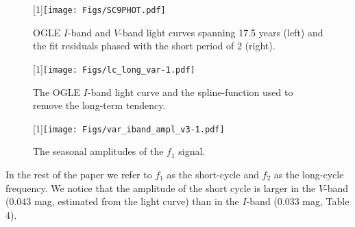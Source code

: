 \documentclass[useAMS,usenatbib]{mn2e}
\begin{document}



\begin{figure}
\scalebox{1}[1]{\texttt{[image: Figs/SC9PHOT.pdf]}}
\caption{OGLE $I$-band and $V$-band light curves spanning 17.5 years (left) and the fit residuals phased with the short period of 2 (right).
}
  \label{x}
\end{figure}

\begin{figure}
\scalebox{1}[1]{\texttt{[image: Figs/lc\_long\_var-1.pdf]}}
\caption{The OGLE $I$-band light curve and the spline-function used to remove the long-term tendency.
}
  \label{x}
\end{figure}

\begin{figure}
\scalebox{1}[1]{\texttt{[image: Figs/var\_iband\_ampl\_v3-1.pdf]}}
\caption{The seasonal amplitudes of the $f_1$ signal.}
  \label{x}
\end{figure}


In the rest of the paper we refer to $f_1$ as the short-cycle  and $f_2$ as the long-cycle frequency. We  notice that the amplitude of the short cycle is larger in the $V$-band (0.043 mag, estimated from the light curve) than in the $I$-band (0.033 mag, Table 4). 
\end{document}
